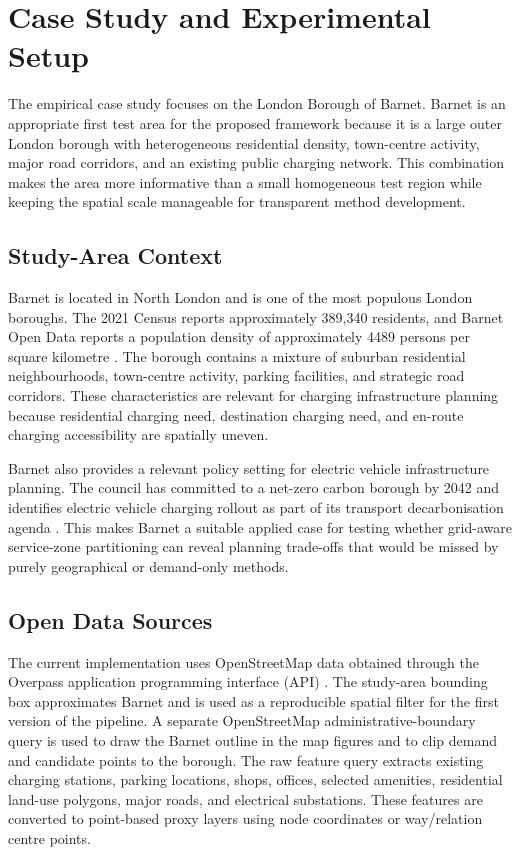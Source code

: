\section{Case Study and Experimental Setup}

The empirical case study focuses on the London Borough of Barnet. Barnet is an appropriate first test area for the proposed framework because it is a large outer London borough with heterogeneous residential density, town-centre activity, major road corridors, and an existing public charging network. This combination makes the area more informative than a small homogeneous test region while keeping the spatial scale manageable for transparent method development.

\subsection{Study-Area Context}
Barnet is located in North London and is one of the most populous London boroughs. The 2021 Census reports approximately 389,340 residents, and Barnet Open Data reports a population density of approximately 4489 persons per square kilometre \cite{barnetPopulation}. The borough contains a mixture of suburban residential neighbourhoods, town-centre activity, parking facilities, and strategic road corridors. These characteristics are relevant for charging infrastructure planning because residential charging need, destination charging need, and en-route charging accessibility are spatially uneven.

Barnet also provides a relevant policy setting for electric vehicle infrastructure planning. The council has committed to a net-zero carbon borough by 2042 and identifies electric vehicle charging rollout as part of its transport decarbonisation agenda \cite{barnetEV}. This makes Barnet a suitable applied case for testing whether grid-aware service-zone partitioning can reveal planning trade-offs that would be missed by purely geographical or demand-only methods.

\subsection{Open Data Sources}
The current implementation uses OpenStreetMap data obtained through the Overpass application programming interface (API) \cite{osmCharging,overpass}. The study-area bounding box approximates Barnet and is used as a reproducible spatial filter for the first version of the pipeline. A separate OpenStreetMap administrative-boundary query is used to draw the Barnet outline in the map figures and to clip demand and candidate points to the borough. The raw feature query extracts existing charging stations, parking locations, shops, offices, selected amenities, residential land-use polygons, major roads, and electrical substations. These features are converted to point-based proxy layers using node coordinates or way/relation centre points.

